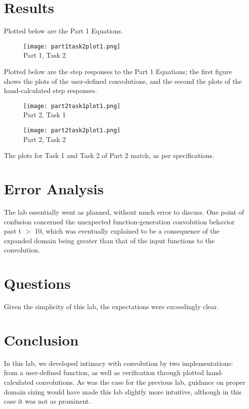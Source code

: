 \documentclass[11pt,a4,titlepage]{article}
\begin{document}
\section{Results}
Plotted below are the Part 1 Equations.
\begin{figure}[H]
	\centering
	\texttt{[image: part1task2plot1.png]}
	\\ Part 1, Task 2
\end{figure}

Plotted below are the step responses to the Part 1 Equations; the first figure shows the plots of the user-defined convolutions, and the second the plots of the hand-calculated step responses.
\begin{figure}[H]
	\centering
	\texttt{[image: part2task1plot1.png]}
	\\ Part 2, Task 1
\end{figure}

\begin{figure}[H]
	\centering
	\texttt{[image: part2task2plot1.png]}
	\\ Part 2, Task 2
\end{figure}
The plots for Task 1 and Task 2 of Part 2 match, as per specifications.

\section{Error Analysis}
The lab essentially went as planned, without much error to discuss. One point of confusion concerned the unexpected function-generation convolution behavior past t $>$ 10, which was eventually explained to be a consequence of the expanded domain being greater than that of the input functions to the convolution.

\section{Questions}
Given the simplicity of this lab, the expectations were exceedingly clear.

\section{Conclusion}
In this lab, we developed intimacy with convolution by two implementations: from a user-defined function, as well as verification through plotted hand-calculated convolutions. As was the case for the previous lab, guidance on proper domain sizing would have made this lab slightly more intuitive, although in this case it was not as prominent.
\end{document}
